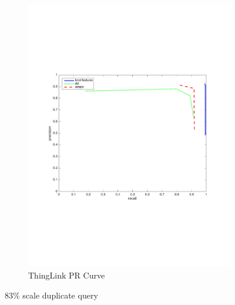 \documentclass[english,12pt,a4paper,pdftex,elec,utf8, table]{aaltothesis}
\begin{document}
\begin{figure}[htb]
\begin{center}
\begin{subfigure}[b]{0.49\textwidth}
    \includegraphics[width=\textwidth]{figures/thinglink_83scalePR.pdf}
    \caption{ThingLink PR Curve}
    \label{83prthinglink}
  \end{subfigure}
  \caption{83\% scale duplicate query}
  \end{center}
\end{figure}

\clearpage
\end{document}
